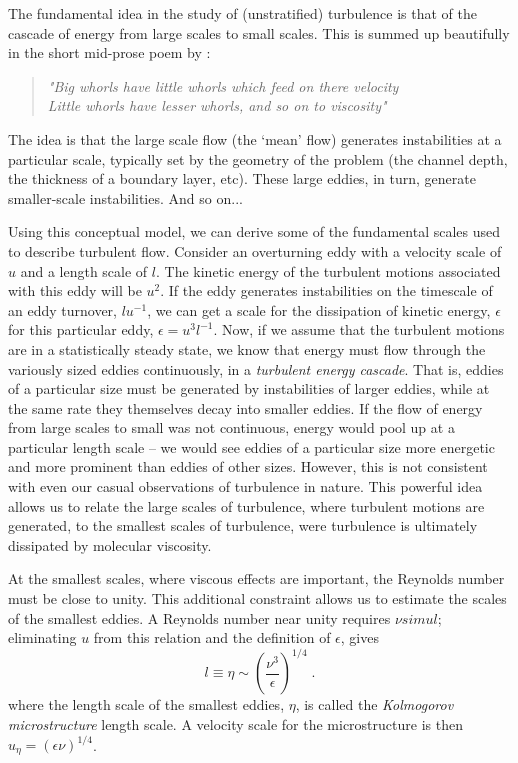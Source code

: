 \documentclass[11pt]{report}
\numberwithin{equation}{section}
\begin{document}
The fundamental idea in the study of (unstratified) turbulence is that of the cascade of energy from large scales to small scales.  This is summed up beautifully in the short mid-prose poem by \citet[][page 66]{richardson:22}:
\begin{quote}
{\itshape "Big whorls have little whorls which feed on there velocity\\
       Little whorls have lesser whorls, and so on to viscosity"}
\end{quote}
The idea is that the large scale flow (the `mean' flow) generates instabilities at a particular scale, typically set by the geometry of the problem (the channel depth, the thickness of a boundary layer, etc).  These large eddies, in turn, generate smaller-scale instabilities.  And so on...

Using this conceptual model, we can derive some of the fundamental scales used to describe turbulent flow.  Consider an overturning eddy with a velocity scale of $u$ and a length scale of $l$.  The kinetic energy of the turbulent motions associated with this eddy will be $u^2$.  If the eddy generates instabilities on the timescale of an eddy turnover, $l u^{-1}$, we can get a scale for the dissipation of kinetic energy, $\epsilon$ for this particular eddy, $\epsilon = u^3 l^{-1}$.  Now, if we assume that the turbulent motions are in a statistically steady state, we know that energy must flow through the variously sized eddies continuously, in a \emph{turbulent energy cascade}.  That is, eddies of a particular size must be generated by instabilities of larger eddies, while at the same rate they themselves decay into smaller eddies.  If the flow of energy from large scales to small was not continuous, energy would pool up at a particular length scale -- we would see eddies of a particular size more energetic and more prominent than eddies of other sizes.  However, this is not consistent with even our casual observations of turbulence in nature.  This powerful idea allows us to relate the large scales of turbulence, where turbulent motions are generated, to the smallest scales of turbulence, were turbulence is ultimately dissipated by molecular viscosity.

At the smallest scales, where viscous effects are important, the Reynolds number must be close to unity.  This additional constraint allows us to estimate the scales of the smallest eddies.  A Reynolds number near unity requires $\nu sim u l$; eliminating $u$ from this relation and the definition of $\epsilon$, gives
\begin{equation}
    l \equiv \eta \sim \left( \frac{\nu^3}{\epsilon} \right)^{1/4} \; .
\end{equation}
where the length scale of the smallest eddies, $\eta$, is called the \emph{Kolmogorov microstructure} length scale.  A velocity scale for the microstructure is then $u_{\eta} = (\epsilon \nu)^{1/4}$.
\end{document}
